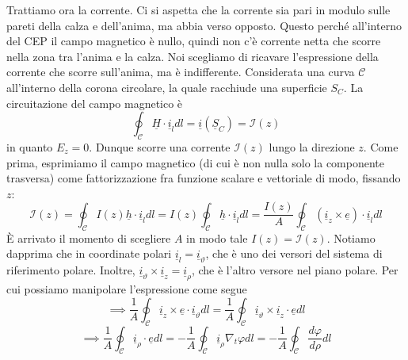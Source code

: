 \documentclass{book}
\begin{document}
        Trattiamo ora la corrente. Ci si aspetta che la corrente sia pari in modulo sulle pareti della calza e dell'anima, ma abbia verso opposto.
        Questo perché all'interno del CEP il campo magnetico è nullo, quindi non c'è corrente netta che scorre nella zona tra l'anima e la calza.
        Noi scegliamo di ricavare l'espressione della corrente che scorre sull'anima, ma è indifferente. Considerata una curva $\mathcal{C}$ all'interno
        della corona circolare, la quale racchiude una superficie $S_{C}$. La circuitazione del campo magnetico è 
        \begin{equation}
        \oint_{\mathcal{C}} \underline{H} \cdot \underline{i}_{l} dl = \underline{i}(\underline{S}_{C}) = \mathcal{I}(z)
        \end{equation}
        in quanto $E_{z} = 0$. Dunque scorre una corrente $\mathcal{I}(z)$ lungo la direzione $z$. Come prima, esprimiamo il campo 
        magnetico (di cui è non nulla solo la componente trasversa) come fattorizzazione fra funzione scalare e vettoriale di modo, 
        fissando $z$:
        \begin{equation}
        \mathcal{I}(z) = \oint_{\mathcal{C}} I(z) \underline{h} \cdot \underline{i}_{l}dl = I(z) \oint_{\mathcal{C}} \underline{h} \cdot \underline{i}_{l} dl= \frac{I(z)}{A}\oint_{\mathcal{C}} (\underline{i}_{z} \times \underline{e}) \cdot \underline{i}_{l}dl
        \end{equation} 
        È arrivato il momento di scegliere $A$ in modo tale $I(z) = \mathcal{I}(z)$. Notiamo dapprima che  in coordinate
        polari $\underline{i}_{l} = \underline{i}_{\vartheta}$, che è uno dei versori del sistema di riferimento polare. Inoltre,
        $\underline{i}_{\vartheta} \times \underline{i}_{z} = \underline{i}_{\rho}$, che è l'altro versore nel piano polare. Per cui possiamo manipolare 
        l'espressione come segue
        \begin{equation}
        \implies \frac{1}{A} \oint_{\mathcal{C}} \underline{i}_{z} \times \underline{e} \cdot \underline{i}_{\vartheta} dl =
        \frac{1}{A} \oint_{\mathcal{C}} \underline{i}_{\vartheta} \times \underline{i}_{z} \cdot \underline{e} dl 
        \end{equation} 
        \begin{equation}
        \implies \frac{1}{A} \oint_{\mathcal{C}} \underline{i}_{\rho} \cdot \underline{e} dl = - \frac{1}{A} \oint_{\mathcal{C}} \underline{i}_{\rho} \nabla_{t} \varphi dl
        = - \frac{1}{A} \oint_{\mathcal{C}} \frac{d \varphi}{d\rho} dl
        \end{equation}
\end{document}
